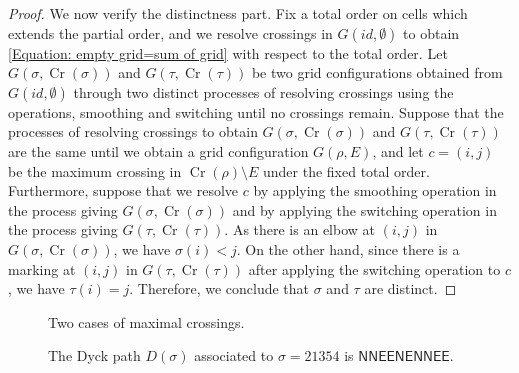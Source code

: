 \documentclass[reqno,12pt]{amsart}
\theoremstyle{definition}
\theoremstyle{remark}
\newcommand\Cr{\operatorname{Cr}}
\newcommand\NS{\mathsf{N}}
\newcommand\ES{\mathsf{E}}
\newcommand\OnlyXmarking[2]
{\draw[very thick] (#1-0.7,#2-0.7)--(#1-0.3,#2-0.3);
\draw[very thick] (#1-0.7,#2-0.3)--(#1-0.3,#2-0.7); }
\newcommand\Xmarking[2]
{\draw[very thick] (#1-0.7,#2-0.7)--(#1-0.3,#2-0.3);
\draw[very thick] (#1-0.7,#2-0.3)--(#1-0.3,#2-0.7);
\draw (#1-1,#2-0.5)--(#1-0.5,#2-0.5);
\draw (#1-0.5,#2-0.5)--(#1-0.5,#2); }
\newcommand\Cross[2]
{\draw (#1-0.5,#2)--(#1-0.5,#2-1);
\draw (#1,#2-0.5)--(#1-1,#2-0.5); }
\newcommand\UP[2]{\draw (#1-0.5,#2)--(#1-0.5,#2-1);}
\newcommand\EAST[2]{\draw (#1,#2-0.5)--(#1-1,#2-0.5);}
\begin{document}
\begin{proof}
  We now verify the distinctness part.
  Fix a total order on cells which extends the partial order,
  and we resolve crossings in \( G(id, \emptyset) \) to obtain
  \eqref{Equation: empty grid=sum of grid} with respect to the total order.
  Let $G(\sigma,\Cr(\sigma))$ and $G(\tau,\Cr(\tau))$ be two grid configurations
  obtained from $G(id,\emptyset)$ through two distinct processes of resolving
  crossings using the operations, smoothing and switching until no crossings
  remain. Suppose that the processes of resolving crossings to obtain
  $G(\sigma,\Cr(\sigma))$ and $G(\tau,\Cr(\tau))$ are the same until we obtain
  a grid configuration $G(\rho,E)$, and let $c=(i,j)$ be the maximum crossing in
  $\Cr(\rho)\setminus E$ under the fixed total order.
  Furthermore, suppose that we resolve $c$ by applying the smoothing operation in the process giving
  $G(\sigma,\Cr(\sigma))$ and by applying the switching operation in the process giving
  $G(\tau,\Cr(\tau))$. As there is an elbow at $(i,j)$ in \( G(\sigma,\Cr(\sigma))
  \), we have $\sigma(i)<j$. On the other hand, since there is a marking at
  $(i,j)$ in \( G(\tau,\Cr(\tau)) \) after applying the switching operation to $c$, we have
  $\tau(i)=j$. Therefore, we conclude that $\sigma$ and $\tau$ are distinct.
\end{proof}



\begin{figure}
  \centering
  
  \caption{Two cases of maximal crossings.}
  \label{Fig: two cases of maximal crossings}
  \end{figure}

\begin{figure}
  \centering
  \caption{The Dyck path \( D(\sigma) \) associated to \( \sigma=21354 \) is
  \( \NS\NS\ES\ES\NS\ES\NS\NS\ES\ES \).}
  \label{fig:D_sigma}
\end{figure}
\end{document}
